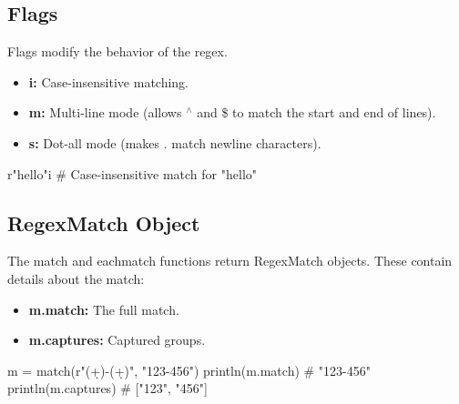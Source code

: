 \documentclass{report}
\begin{document}
     \bigbreak \noindent 
     \subsection{Flags}
     \bigbreak \noindent 
     Flags modify the behavior of the regex. 
     \begin{itemize}
         \item \textbf{i:} Case-insensitive matching.
         \item \textbf{m:} Multi-line mode (allows $^{\land} $ and \$ to match the start and end of lines).
         \item \textbf{s:} Dot-all mode (makes . match newline characters).
     \end{itemize}
     \bigbreak \noindent 
     \begin{jlcode}
     r"hello"i  # Case-insensitive match for "hello"
     \end{jlcode}

     \bigbreak \noindent 
     \subsection{RegexMatch Object}
     \bigbreak \noindent 
     The match and eachmatch functions return RegexMatch objects. These contain details about the match:
     \begin{itemize}
         \item \textbf{m.match:} The full match.
         \item \textbf{m.captures:} Captured groups.
     \end{itemize}
     \bigbreak \noindent 
     \begin{jlcode}
         m = match(r"(\d+)-(\d+)", "123-456")
         println(m.match)    # "123-456"
         println(m.captures) # ["123", "456"]
     \end{jlcode}




















    
\end{document}
